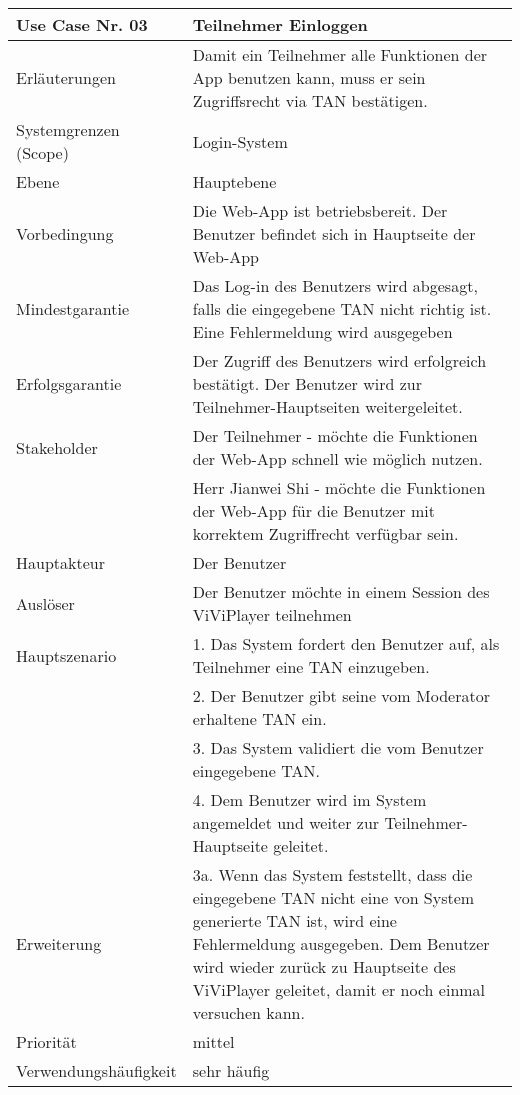 \begin{tabularx}{\linewidth}{|l|X|}
	\hline
	Use Case Nr. 03			& \textbf{Teilnehmer Einloggen} \\ \hline
	Erläuterungen			& Damit ein Teilnehmer alle Funktionen der App benutzen kann, 
							  muss er sein Zugriffsrecht via TAN bestätigen. \\ \hline
	Systemgrenzen (Scope)	& Login-System \\ \hline
	Ebene					& Hauptebene \\ \hline
	Vorbedingung			& Die Web-App ist betriebsbereit. Der Benutzer befindet sich in
							  Hauptseite der Web-App \\ \hline
	Mindestgarantie			& Das Log-in des Benutzers wird abgesagt, falls die eingegebene
							  TAN nicht richtig ist. Eine Fehlermeldung wird ausgegeben
							  \\ \hline
	Erfolgsgarantie			& Der Zugriff des Benutzers wird erfolgreich bestätigt. Der
							  Benutzer wird zur Teilnehmer-Hauptseiten weitergeleitet. 
							  \\ \hline
	Stakeholder				& Der Teilnehmer - möchte die Funktionen der Web-App schnell 
							  wie möglich nutzen. \\
							& Herr Jianwei Shi - möchte die Funktionen der Web-App für die Benutzer 
							  mit korrektem Zugriffrecht verfügbar sein.\\ \hline
	Hauptakteur				& Der Benutzer \\ \hline
	Auslöser				& Der Benutzer möchte in einem Session des ViViPlayer teilnehmen
							  \\ \hline	
	Hauptszenario			& 1. Das System fordert den Benutzer auf, als Teilnehmer eine
							  TAN einzugeben. \\
							& 2. Der Benutzer gibt seine vom Moderator erhaltene TAN ein. \\
							& 3. Das System validiert die vom Benutzer eingegebene
							  TAN. \\
							& 4. Dem Benutzer wird im System angemeldet und weiter zur
							  Teilnehmer-Hauptseite geleitet. \\ \hline
	Erweiterung				& 3a. Wenn das System feststellt, dass die eingegebene TAN nicht 
							  eine von System generierte TAN ist, wird eine Fehlermeldung 
							  ausgegeben. Dem Benutzer wird wieder zurück zu Hauptseite des
							  ViViPlayer geleitet, damit er noch einmal versuchen kann. \\
							  \hline
	Priorität				& mittel \\ \hline
	Verwendungshäufigkeit	& sehr häufig \\ \hline
\end{tabularx}
